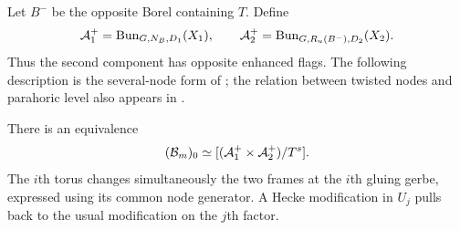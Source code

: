 Let $B^-$ be the opposite Borel containing $T$.  Define
\[
 \mathcal A_1^+=\operatorname{Bun}_{G,N_B,D_1}(X_1),\qquad
 \mathcal A_2^+=\operatorname{Bun}_{G,R_u(B^-),D_2}(X_2).
\]
Thus the second component has opposite enhanced flags.  The following
description is the several-node form of \cite[Lemma~8.2]{CT}; the
relation between twisted nodes and parahoric level also appears in
\cite[Section~2.3, Proposition~3.1.5, and Lemma~3.2.3]{NYGluing}.

\begin{lemma}\label{con:quotient}
There is an equivalence
\begin{equation}\label{con:special-quotient}
 (\mathcal B_m)_0\simeq
       [(\mathcal A_1^+\times\mathcal A_2^+)/T^s].
\end{equation}
The $i$th torus changes simultaneously the two frames at the $i$th
gluing gerbe, expressed using its common node generator.  A Hecke
modification in $U_j$ pulls back to the usual modification on the
$j$th factor.
\end{lemma}

